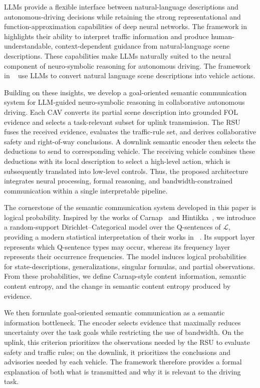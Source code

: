 \documentclass[10pt, conference, letterpaper]{ IEEEtran}
\theoremstyle{bfnote}
\begin{document}
LLMs provide a flexible interface between natural-language descriptions and autonomous-driving decisions while retaining the strong representational and function-approximation capabilities of deep neural networks. The framework in~\cite{Carvalho2025LLMPoweredFF} highlights their ability to interpret traffic information and produce human-understandable, context-dependent guidance from natural-language scene descriptions. These capabilities make LLMs naturally suited to the neural component of neuro-symbolic reasoning for autonomous driving. The framework in ~\cite{Cui2025CoopReflectTN} use LLMs to convert natural language scene descriptions into vehicle actions. 

Building on these insights, we develop a goal-oriented semantic communication system for LLM-guided neuro-symbolic reasoning in collaborative autonomous driving. Each CAV converts its partial scene description into grounded FOL evidence and selects a task-relevant subset for uplink transmission. The RSU fuses the received evidence, evaluates the traffic-rule set, and derives collaborative safety and right-of-way conclusions. A downlink semantic encoder then selects the deductions to send to corresponding vehicle. The receiving vehicle combines these deductions with its local description to select a high-level action, which is subsequently translated into low-level controls. Thus, the proposed architecture integrates neural processing, formal reasoning, and bandwidth-constrained communication within a single interpretable pipeline.

The cornerstone of the semantic communication system developed in this paper is logical probability. Inspired by the works of Carnap~\cite{c1, c2, carnap_logical_1962} and Hintikka~\cite{c10, Hintikka_combined, c9, Niiniluoto2011TheDO}, we introduce a random-support Dirichlet--Categorical model over the Q-sentences of $\mathcal{L}$, providing a modern statistical interpretation of their works in ~\cite{carnap_logical_1962, c1, c10, c9}. Its support layer represents which Q-sentence types may occur, whereas its frequency layer represents their occurrence frequencies. The model induces logical probabilities for state-descriptions, generalizations, singular formulas, and partial observations. From these probabilities, we define Carnap-style content information, semantic content entropy, and the change in semantic content entropy produced by evidence.

We then formulate goal-oriented semantic communication as a semantic information bottleneck. The encoder selects evidence that maximally reduces uncertainty over the task goals while restricting the use of bandwidth. On the uplink, this criterion prioritizes the observations needed by the RSU to evaluate safety and traffic rules; on the downlink, it prioritizes the conclusions and advisories needed by each vehicle. The framework therefore provides a formal explanation of both what is transmitted and why it is relevant to the driving task.
\end{document}
